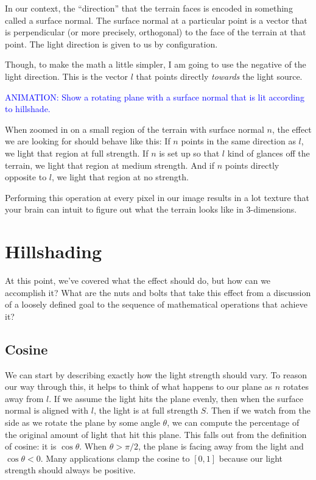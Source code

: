 \documentclass{article}
\newcommand\animation[1]{\textcolor{blue}{ANIMATION: #1}}
\begin{document}
In our context, the ``direction'' that the terrain faces is encoded in something called a surface normal.
The surface normal at a particular point is a vector that is perpendicular (or more precisely, orthogonal) to the face of the terrain at that point.
The light direction is given to us by configuration.

Though, to make the math a little simpler, I am going to use the negative of the light direction.
This is the vector $l$ that points directly \textit{towards} the light source.

\animation{Show a rotating plane with a surface normal that is lit according to hillshade.}

When zoomed in on a small region of the terrain with surface normal $n$, the effect we are looking for should behave like this:
If $n$ points in the same direction as $l$, we light that region at full strength.
If $n$ is set up so that $l$ kind of glances off the terrain, we light that region at medium strength.
And if $n$ points directly opposite to $l$, we light that region at no strength.

Performing this operation at every pixel in our image results in a lot texture that your brain can intuit to figure out what the terrain looks like in 3-dimensions.

\section{Hillshading}

At this point, we've covered what the effect should do, but how can we accomplish it?
What are the nuts and bolts that take this effect from a discussion of a loosely defined goal to the sequence of mathematical operations that achieve it?

\subsection{Cosine}

We can start by describing exactly how the light strength should vary.
To reason our way through this, it helps to think of what happens to our plane as $n$ rotates away from $l$.
If we assume the light hits the plane evenly, then when the surface normal is aligned with $l$, the light is at full strength $S$.
Then if we watch from the side as we rotate the plane by some angle $\theta$, we can compute the percentage of the original amount of light that hit this plane.
This falls out from the definition of cosine: it is $\cos \theta$.
When $\theta > \pi/2$, the plane is facing away from the light and $\cos \theta < 0$.
Many applications clamp the cosine to $[0, 1]$ because our light strength should always be positive.
\end{document}
